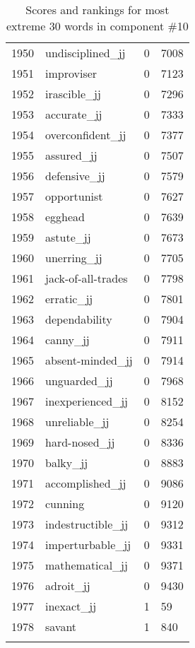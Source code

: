 \begin{longtable}[!htbp]{| rlr@{.}l |}
    1950 & undisciplined\_jj & 0 & 7008 \\
    1951 & improviser & 0 & 7123 \\
    1952 & irascible\_jj & 0 & 7296 \\
    1953 & accurate\_jj & 0 & 7333 \\
    1954 & overconfident\_jj & 0 & 7377 \\
    1955 & assured\_jj & 0 & 7507 \\
    1956 & defensive\_jj & 0 & 7579 \\
    1957 & opportunist & 0 & 7627 \\
    1958 & egghead & 0 & 7639 \\
    1959 & astute\_jj & 0 & 7673 \\
    1960 & unerring\_jj & 0 & 7705 \\
    1961 & jack-of-all-trades & 0 & 7798 \\
    1962 & erratic\_jj & 0 & 7801 \\
    1963 & dependability & 0 & 7904 \\
    1964 & canny\_jj & 0 & 7911 \\
    1965 & absent-minded\_jj & 0 & 7914 \\
    1966 & unguarded\_jj & 0 & 7968 \\
    1967 & inexperienced\_jj & 0 & 8152 \\
    1968 & unreliable\_jj & 0 & 8254 \\
    1969 & hard-nosed\_jj & 0 & 8336 \\
    1970 & balky\_jj & 0 & 8883 \\
    1971 & accomplished\_jj & 0 & 9086 \\
    1972 & cunning & 0 & 9120 \\
    1973 & indestructible\_jj & 0 & 9312 \\
    1974 & imperturbable\_jj & 0 & 9331 \\
    1975 & mathematical\_jj & 0 & 9371 \\
    1976 & adroit\_jj & 0 & 9430 \\
    1977 & inexact\_jj & 1 & 59 \\
    1978 & savant & 1 & 840 \\
    \hline
    \caption{Scores and rankings for most extreme 30 words in component \#10} \\
\end{longtable}
